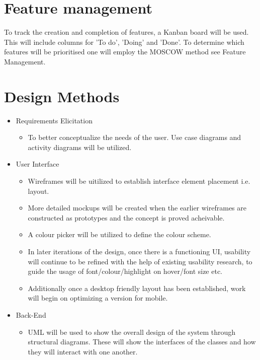 \section{Feature management}
  To track the creation and completion of features, a Kanban board will be used. This will include columns for 'To do', 'Doing' and 'Done'.
  To determine which features will be prioritised one will employ the MOSCOW method see Feature Management.

\section{Design Methods}
   \begin{itemize}
     \item Requirements Elicitation
     \begin{itemize}
       \item To better conceptualize the needs of the user. Use case diagrams and activity diagrams will be utilized.
     \end{itemize}
     \item User Interface
     \begin{itemize}
       \item Wireframes will be uitilized to establish interface element placement i.e. layout.
       \item More detailed mockups will be created when the earlier wireframes are constructed as prototypes and the concept is proved acheivable.
       \item A colour picker will be utilized to define the colour scheme.
       \item In later iterations of the design, once there is a functioning UI,
       usability will continue to be refined with the help of existing usability research,
       to guide the usage of font/colour/highlight on hover/font size etc.
       \item Additionally once a desktop friendly layout has been established, work will begin on optimizing a version for mobile.
     \end{itemize}
     \item Back-End
     \begin{itemize}
       \item UML will be used to show the overall design of the system through structural diagrams. These will show the interfaces of the classes and how they will interact with one another.
     \end{itemize}
   \end{itemize}

